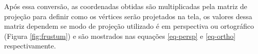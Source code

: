 \begin{figure}[h!]
	\centering
\end{figure}

Após essa conversão, as coordenadas obtidas são multiplicadas pela matriz de projeção para definir como os vértices serão projetados na tela, os valores dessa matriz dependem se modo de projeção utilizado é em perspectiva ou ortográfico (Figura \ref{fig:frustum}) e são mostrados nas equações \ref{eq-persp} e \ref{eq-ortho} respectivamente. 

\begin{figure}[h!]
	\centering
	\begin{subfigure}{0.45\textwidth}
	\end{subfigure}
	\hfill
	\begin{subfigure}{0.47\textwidth}
	\end{subfigure}
	{
	}
\end{figure}

